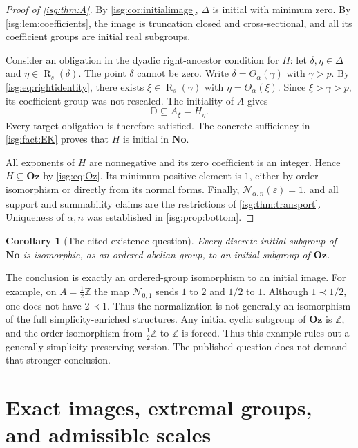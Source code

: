 \documentclass[11pt]{article}
\newtheorem{corollary}[corollary]{Corollary}
\theoremstyle{definition}
\theoremstyle{remark}
\newcommand{\No}{\ensuremath{\mathbf{No}}}
\newcommand{\Oz}{\ensuremath{\mathbf{Oz}}}
\newcommand{\Z}{\mathbb{Z}}
\newcommand{\D}{\mathbb{D}}
\newcommand{\Rs}{\operatorname{R}_{s}}
\newcommand{\pr}{\mathrel{\prec}}
\newcommand{\Rect}{\mathcal{N}_{\alpha,n}}
\newcommand{\tht}{\Theta_{\alpha}}
\begin{document}
\begin{proof}[Proof of \cref{isg:thm:A}]
By \cref{isg:cor:initialimage}, $\Delta$ is initial with minimum zero.
By \cref{isg:lem:coefficients}, the image is truncation closed and
cross-sectional, and all its coefficient groups are initial real
subgroups.

Consider an obligation in the dyadic right-ancestor condition for $H$:
let $\delta,\eta\in\Delta$ and $\eta\in\Rs(\delta)$.
The point $\delta$ cannot be zero. Write $\delta=\tht(\gamma)$
with $\gamma>p$. By \eqref{isg:eq:rightidentity}, there exists
$\xi\in\Rs(\gamma)$ with $\eta=\tht(\xi)$. Since $\xi>\gamma>p$,
its coefficient group was not rescaled. The initiality of $A$ gives
\[
 \D\subseteq A_\xi=H_\eta.
\]
Every target obligation is therefore satisfied. The concrete sufficiency
in \cref{isg:fact:EK} proves that $H$ is initial in $\No$.

All exponents of $H$ are nonnegative and its zero coefficient is an
integer. Hence $H\subseteq\Oz$ by \eqref{isg:eq:Oz}. Its minimum positive
element is $1$, either by order-isomorphism or directly from its normal
forms. Finally, $\Rect(\varepsilon)=1$, and all support and summability
claims are the restrictions of \cref{isg:thm:transport}. Uniqueness of
$\alpha,n$ was established in \cref{isg:prop:bottom}.
\end{proof}

\begin{corollary}[The cited existence question]\label{isg:cor:answer}
Every discrete initial subgroup of $\No$ is isomorphic, as an ordered
abelian group, to an initial subgroup of $\Oz$.
\end{corollary}

\begin{remark}\label{isg:rem:notsimplicity}
The conclusion is exactly an ordered-group isomorphism to an initial
image. For example, on $A=\frac12\Z$ the map $\mathcal N_{0,1}$
sends $1$ to $2$ and $1/2$ to $1$. Although $1\pr1/2$, one does not
have $2\pr1$. Thus the normalization is not generally an isomorphism
of the full simplicity-enriched structures. Any initial cyclic subgroup
of $\Oz$ is $\Z$, and the order-isomorphism from $\frac12\Z$ to
$\Z$ is forced. Thus this example rules out a generally
simplicity-preserving version. The published question does not demand
that stronger conclusion.
\end{remark}

\section{Exact images, extremal groups, and admissible scales}\label{isg:sec:classification}
\end{document}
